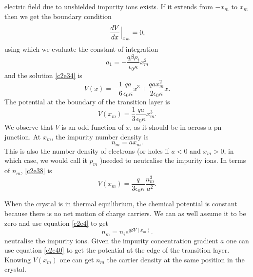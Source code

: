 electric field due to unshielded impurity ions exists. If it extends from $-x_m$
to $x_m$ then we get the boundary condition
\begin{equation}\label{c2e35}
\frac{d{V}}{d{x}}\Big|_{x_m} = 0,
\end{equation}
using which we evaluate the constant of integration
\begin{equation}\label{c2e36}
a_1 = -\frac{q\beta\rho_i}{\epsilon_0\kappa}x_m^2
\end{equation}
and the solution \eqref{c2e34} is
\begin{equation}\label{c2e37}
V(x) = -\frac{1}{6}\frac{qa}{\epsilon_0\kappa}x^3 + 
\frac{qax_m^2}{2\epsilon_0\kappa}x.
\end{equation}
The potential at the boundary of the transition layer is
\begin{equation}\label{c2e38}
V(x_m) = \frac{1}{3}\frac{qa}{\epsilon_0\kappa}x_m^3.
\end{equation}
We observe that $V$ is an odd function of $x$, as it should be in across a pn
junction. At $x_m$, the impurity number density is
\begin{equation}\label{c2e39}
n_m = ax_m.
\end{equation}
This is also the number density of electrons (or holes if $a < 0$ and $x_m > 0$,
in which case, we would call it $p_m$ )needed to neutralise the impurity ions.
In terms of $n_m$, 
\eqref{c2e38} is
\begin{equation}\label{c2e40}
V(x_m) = \frac{q}{3\epsilon_0\kappa}\frac{n_m^3}{a^2}.
\end{equation}

When the crystal is in thermal equilibrium, the chemical potential is constant
because there is no net motion of charge carriers. We can as well assume it to
be zero and use equation \eqref{c2e4} to get
\begin{equation}\label{c2e41}
n_m = n_i e^{q\beta V(x_m)}.
\end{equation}
neutralise the impurity ions. Given the impurity concentration gradient $a$
one can use equation \eqref{c2e40} to get the potential at the edge of the 
transition layer. Knowing $V(x_m)$ one can get $n_m$ the carrier density at the
same position in the crystal.

